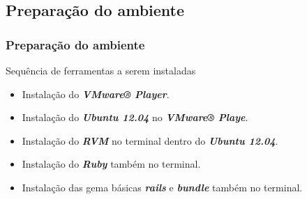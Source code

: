 \subsection{Preparação do ambiente}
\begin{frame}
 \frametitle{Preparação do ambiente}

  \begin{block}{Sequência de ferramentas a serem instaladas}

   \begin{itemize}

    \item Instalação do \emph{\textbf{VMware® Player}}.

    \item Instalação do \emph{\textbf{Ubuntu 12.04}} no \emph{\textbf{VMware® Playe}}.

    \item Instalação do \emph{\textbf{RVM}} no terminal dentro do \emph{\textbf{Ubuntu 12.04}}.

    \item Instalação do \emph{\textbf{Ruby}} também no terminal.

    \item Instalação das gema básicas \emph{\textbf{rails}} e \emph{\textbf{bundle}} também no terminal.

   \end{itemize}

  \end{block}

\end{frame}


